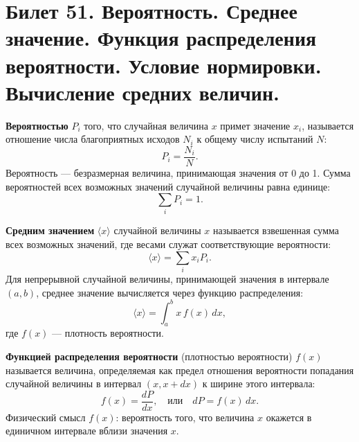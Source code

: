 \section{Билет 51. Вероятность. Среднее значение. Функция распределения вероятности. Условие нормировки. Вычисление средних величин.}

\begin{definition}
\textbf{Вероятностью} $P_i$ того, что случайная величина $x$ примет значение $x_i$, называется отношение числа благоприятных исходов $N_i$ к общему числу испытаний $N$:
\begin{equation}
    P_i = \frac{N_i}{N}. \label{eq:prob_def_51}
\end{equation}
Вероятность --- безразмерная величина, принимающая значения от 0 до 1. Сумма вероятностей всех возможных значений случайной величины равна единице:
\begin{equation}
    \sum_i P_i = 1. \label{eq:prob_sum_51}
\end{equation}
\end{definition}

\begin{definition}
\textbf{Средним значением} $\langle x \rangle$ случайной величины $x$ называется взвешенная сумма всех возможных значений, где весами служат соответствующие вероятности:
\begin{equation}
    \langle x \rangle = \sum_i x_i P_i. \label{eq:mean_discrete_51}
\end{equation}
Для непрерывной случайной величины, принимающей значения в интервале $(a, b)$, среднее значение вычисляется через функцию распределения:
\begin{equation}
    \langle x \rangle = \int_a^b x \, f(x) \, dx, \label{eq:mean_continuous_51}
\end{equation}
где $f(x)$ --- плотность вероятности.
\end{definition}

\begin{definition}
\textbf{Функцией распределения вероятности} (плотностью вероятности) $f(x)$ называется величина, определяемая как предел отношения вероятности попадания случайной величины в интервал $(x, x+dx)$ к ширине этого интервала:
\begin{equation}
    f(x) = \frac{dP}{dx}, \quad \text{или} \quad dP = f(x) \, dx. \label{eq:distribution_func_51}
\end{equation}
Физический смысл $f(x)$: вероятность того, что величина $x$ окажется в единичном интервале вблизи значения $x$.
\end{definition}

